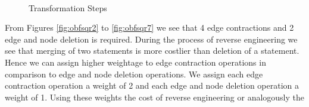 \documentclass[conference]{IEEEtran}
\begin{document}
\begin{figure}[ht!]
{	\label{fig:obfsqr4}
 }
 \\
\caption{Transformation Steps}
\label{fig:transfrm}
\end{figure}
From Figures \ref{fig:obfsqr2} to \ref{fig:obfsqr7} we see that 4 edge contractions and 2 edge and node deletion is required. During the process of reverse engineering we see that merging 
of two statements is more costlier than deletion of a statement. Hence we can assign higher weightage to edge contraction operations in comparison to edge and node deletion operations. 
We assign each edge contraction operation a weight of 2 and each edge and node deletion operation a weight of 1. Using these weights the cost of reverse engineering or analogously the 
\end{document}
